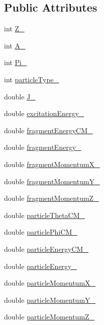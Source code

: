 \subsection*{Public Attributes}
\begin{DoxyCompactItemize}
\item 
int \hyperlink{classDecayProduct_a63c69c5515d18b7fa031623dbf70707f}{Z\-\_\-}
\item 
int \hyperlink{classDecayProduct_af9a9277f843631c34ae9a333dc95e262}{A\-\_\-}
\item 
int \hyperlink{classDecayProduct_a67f29a58426c136c7b7ac6e7afb1791e}{Pi\-\_\-}
\item 
int \hyperlink{classDecayProduct_ab567df06fabfa13a502d37b0e4116f6c}{particle\-Type\-\_\-}
\item 
double \hyperlink{classDecayProduct_a7b929cb262067fbfae442cc2158a157b}{J\-\_\-}
\item 
double \hyperlink{classDecayProduct_af20a395130c97f542961ebe1117aa5fe}{excitation\-Energy\-\_\-}
\item 
double \hyperlink{classDecayProduct_aebe2996e188ca934c79176b642c94808}{fragment\-Energy\-C\-M\-\_\-}
\item 
double \hyperlink{classDecayProduct_a4020d3a3e616416e256bf3e0c9339db4}{fragment\-Energy\-\_\-}
\item 
double \hyperlink{classDecayProduct_ab1d61ecb4f27f726d867b00a27bdc1f0}{fragment\-Momentum\-X\-\_\-}
\item 
double \hyperlink{classDecayProduct_aecdeb7a1909ba213abcd127d68f7f010}{fragment\-Momentum\-Y\-\_\-}
\item 
double \hyperlink{classDecayProduct_a147294524969225c542fe2cc5d18e3ea}{fragment\-Momentum\-Z\-\_\-}
\item 
double \hyperlink{classDecayProduct_ae06d6475e1134adeb1c8bd44cb2e651a}{particle\-Theta\-C\-M\-\_\-}
\item 
double \hyperlink{classDecayProduct_aa0c105dd348ccba325596088a4116bfb}{particle\-Phi\-C\-M\-\_\-}
\item 
double \hyperlink{classDecayProduct_a674fd452946e449ccaf9255e8e0094b1}{particle\-Energy\-C\-M\-\_\-}
\item 
double \hyperlink{classDecayProduct_a118e0199e06a0e42f226ef2033346380}{particle\-Energy\-\_\-}
\item 
double \hyperlink{classDecayProduct_aacbc3eba4f785c7eeb43aa5f5c02dbcf}{particle\-Momentum\-X\-\_\-}
\item 
double \hyperlink{classDecayProduct_a351e4d1c64cacd628b353552fe0437ac}{particle\-Momentum\-Y\-\_\-}
\item 
double \hyperlink{classDecayProduct_ae66ea18cdf5326506410db0fd938a10e}{particle\-Momentum\-Z\-\_\-}
\end{DoxyCompactItemize}



